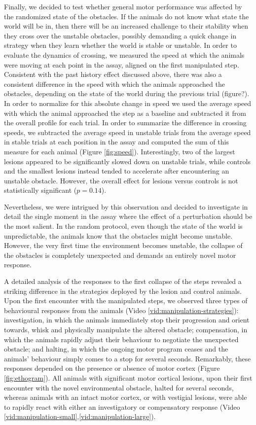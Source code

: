 Finally, we decided to test whether general motor performance was affected by the randomized state of the obstacles. If the animals do not know what state the world will be in, then there will be an increased challenge to their stability when they cross over the unstable obstacles, possibly demanding a quick change in strategy when they learn whether the world is stable or unstable. In order to evaluate the dynamics of crossing, we measured the speed at which the animals were moving at each point in the assay, aligned on the first manipulated step. Consistent with the past history effect discussed above, there was also a consistent difference in the speed with which the animals approached the obstacles, depending on the state of the world during the previous trial (figure?). In order to normalize for this absolute change in speed we used the average speed with which the animal approached the step as a baseline and subtracted it from the overall profile for each trial. In order to summarize the difference in crossing speeds, we subtracted the average speed in unstable trials from the average speed in stable trials at each position in the assay and computed the sum of this measure for each animal (Figure \ref{fig:speed}). Interestingly, two of the largest lesions appeared to be significantly slowed down on unstable trials, while controls and the smallest lesions instead tended to accelerate after encountering an unstable obstacle. However, the overall effect for lesions versus controls is not statistically significant ($p = 0.14$).

Nevertheless, we were intrigued by this observation and decided to investigate in detail the single moment in the assay where the effect of a perturbation should be the most salient. In the random protocol, even though the state of the world is unpredictable, the animals know that the obstacles might become unstable. However, the very first time the environment becomes unstable, the collapse of the obstacles is completely unexpected and demands an entirely novel motor response.

A detailed analysis of the responses to the first collapse of the steps revealed a striking difference in the strategies deployed by the lesion and control animals. Upon the first encounter with the manipulated steps, we observed three types of behavioural responses from the animals (Video \ref{vid:manipulation-strategies}): investigation, in which the animals immediately stop their progression and orient towards, whisk and physically manipulate the altered obstacle; compensation, in which the animals rapidly adjust their behaviour to negotiate the unexpected obstacle; and halting, in which the ongoing motor program ceases and the animals' behaviour simply comes to a stop for several seconds. Remarkably, these responses depended on the presence or absence of motor cortex (Figure \ref{fig:ethogram}). All animals with significant motor cortical lesions, upon their first encounter with the novel environmental obstacle, halted for several seconds, whereas animals with an intact motor cortex, or with vestigial lesions, were able to rapidly react with either an investigatory or compensatory response (Video \ref{vid:manipulation-small},\ref{vid:manipulation-large}).

